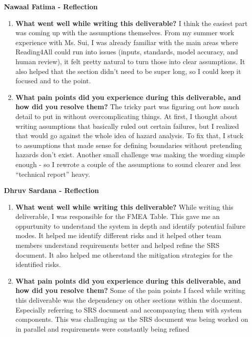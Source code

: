 \documentclass{article}
\begin{document}
\textbf{Nawaal Fatima  - Reflection}
\begin{enumerate}
  \item \textbf{What went well while writing this deliverable?}\newline
    I think the easiest part was coming up with the assumptions
    themselves. From my summer work experience with Ms. Sui, I was already familiar with the main areas where Reading4All
    could run into issues (inputs, standards, model accuracy, and
    human review), it felt pretty natural to turn those into clear
    assumptions. It also helped that the section didn’t need to be
    super long, so I could keep it focused and to the point.

  \item \textbf{What pain points did you experience during this
    deliverable, and how did you resolve them?}\newline
    The tricky part was figuring out how much detail to put in
    without overcomplicating things. At first, I thought about
    writing assumptions that basically ruled out certain failures,
    but I realized that would go against the whole idea of hazard
    analysis. To fix that, I stuck to assumptions that made sense for
    defining boundaries without pretending hazards don’t exist.
    Another small challenge was making the wording simple enough - so
    I rewrote a couple of the assumptions to sound clearer and less
    ``technical report'' heavy.
\end{enumerate}

\textbf{Dhruv Sardana  - Reflection}
\begin{enumerate}
  \item \textbf{What went well while writing this deliverable?}\newline
    While writing this deliverable, I was responsible for the FMEA Table. This gave me an oppurtunity to 
    understand the system in depth and identify potential failure modes. It helped me identify different risks and 
    it helped other team members understand requirements better and helped refine the SRS document. 
    It also helped me otherstand the mitigation strategies for the identified risks.

  \item \textbf{What pain points did you experience during this
    deliverable, and how did you resolve them?}\newline
    Some of the pain points I faced while writing this deliverable was the dependency on other sections within the document.
    Especially referring to SRS document and accompanying them with system components. 
    This was challenging as the SRS document was being worked on in parallel and requirements were constantly being refined
\end{enumerate}
\end{document}
